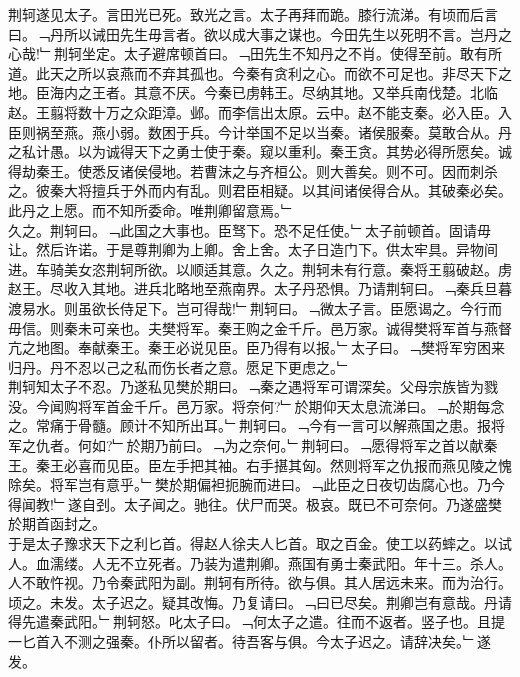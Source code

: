 \documentclass{zhvt-classic}
\begin{document}
\hspace*{2em}荆轲遂见太子。言田光已死。致光之言。太子再拜而跪。膝行流涕。有顷而后言曰。﹁丹所以诫田先生毋言者。欲以成大事之谋也。今田先生以死明不言。岂丹之心哉!﹂荆轲坐定。太子避席顿首曰。﹁田先生不知丹之不肖。使得至前。敢有所道。此天之所以哀燕而不弃其孤也。今秦有贪利之心。而欲不可足也。非尽天下之地。臣海内之王者。其意不厌。今秦已虏韩王。尽纳其地。又举兵南伐楚。北临赵。王翦将数十万之众距漳。邺。而李信出太原。云中。赵不能支秦。必入臣。入臣则祸至燕。燕小弱。数困于兵。今计举国不足以当秦。诸侯服秦。莫敢合从。丹之私计愚。以为诚得天下之勇士使于秦。窥以重利。秦王贪。其势必得所愿矣。诚得劫秦王。使悉反诸侯侵地。若曹沫之与齐桓公。则大善矣。则不可。因而刺杀之。彼秦大将擅兵于外而内有乱。则君臣相疑。以其间诸侯得合从。其破秦必矣。此丹之上愿。而不知所委命。唯荆卿留意焉。﹂\\
\hspace*{2em}久之。荆轲曰。﹁此国之大事也。臣驽下。恐不足任使。﹂太子前顿首。固请毋让。然后许诺。于是尊荆卿为上卿。舍上舍。太子日造门下。供太牢具。异物间进。车骑美女恣荆轲所欲。以顺适其意。久之。荆轲未有行意。秦将王翦破赵。虏赵王。尽收入其地。进兵北略地至燕南界。太子丹恐惧。乃请荆轲曰。﹁秦兵旦暮渡易水。则虽欲长侍足下。岂可得哉!﹂荆轲曰。﹁微太子言。臣愿谒之。今行而毋信。则秦未可亲也。夫樊将军。秦王购之金千斤。邑万家。诚得樊将军首与燕督亢之地图。奉献秦王。秦王必说见臣。臣乃得有以报。﹂太子曰。﹁樊将军穷困来归丹。丹不忍以己之私而伤长者之意。愿足下更虑之。﹂\\
\hspace*{2em}荆轲知太子不忍。乃遂私见樊於期曰。﹁秦之遇将军可谓深矣。父母宗族皆为戮没。今闻购将军首金千斤。邑万家。将奈何?﹂於期仰天太息流涕曰。﹁於期每念之。常痛于骨髓。顾计不知所出耳。﹂荆轲曰。﹁今有一言可以解燕国之患。报将军之仇者。何如?﹂於期乃前曰。﹁为之奈何。﹂荆轲曰。﹁愿得将军之首以献秦王。秦王必喜而见臣。臣左手把其袖。右手揕其匈。然则将军之仇报而燕见陵之愧除矣。将军岂有意乎。﹂樊於期偏袒扼腕而进曰。﹁此臣之日夜切齿腐心也。乃今得闻教!﹂遂自刭。太子闻之。驰往。伏尸而哭。极哀。既已不可奈何。乃遂盛樊於期首函封之。\\
\hspace*{2em}于是太子豫求天下之利匕首。得赵人徐夫人匕首。取之百金。使工以药蟀之。以试人。血濡缕。人无不立死者。乃装为遣荆卿。燕国有勇士秦武阳。年十三。杀人。人不敢忤视。乃令秦武阳为副。荆轲有所待。欲与俱。其人居远未来。而为治行。顷之。未发。太子迟之。疑其改悔。乃复请曰。﹁曰已尽矣。荆卿岂有意哉。丹请得先遣秦武阳。﹂荆轲怒。叱太子曰。﹁何太子之遣。往而不返者。竖子也。且提一匕首入不测之强秦。仆所以留者。待吾客与俱。今太子迟之。请辞决矣。﹂遂发。\\
\end{document}
